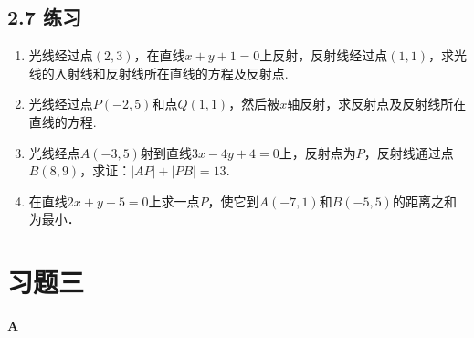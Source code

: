 \subsection*{2.7 练习}
\begin{enumerate}
\item 光线经过点$(2,3)$，在直线$x+y+1=0$上反射，反射线经过点$(1,1)$，求光线的入射线和反射线所在直线的方程及反射点.
\item 光线经过点$P(-2,5)$和点$Q(1,1)$，然后被$x$轴反射，求反射点及反射线所在直线的方程.
\item 光线经点$A(-3,5)$射到直线$3x-4y+4=0$上，反射点为$P$，反射线通过点$B(8,9)$，求证：$|AP|+|PB|=13$.
   \item 在直线$2x+y-5=0$上求一点$P$，使它到$A(-7,1)$和$B(-5,5)$的距离之和为最小．
\end{enumerate}

\section*{习题三}
\begin{center}
    \bfseries A
\end{center}

